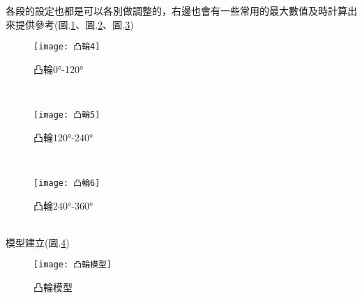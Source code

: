 \begin{itemize}
		\qquad 各段的設定也都是可以各別做調整的，右邊也會有一些常用的最大數值及時計算出來提供參考(圖.\ref{2.14}、圖.\ref{2.15}、圖.\ref{2.16})
		\begin{figure}[hbt!]
		\begin{center}
		\texttt{[image: 凸輪4]}
		\caption{\Large 凸輪0°-120°}\label{2.14}
		\end{center}
		\end{figure}
		\\
		\begin{figure}[hbt!]
		\begin{center}
		\texttt{[image: 凸輪5]}
		\caption{\Large 凸輪120°-240°}\label{2.15}
		\end{center}
		\end{figure}
		\\
		\begin{figure}[hbt!]
		\begin{center}
		\texttt{[image: 凸輪6]}
		\caption{\Large 凸輪240°-360°}\label{2.16}
		\end{center}
		\end{figure}
		\\
		模型建立(圖.\ref{2.17})
		\begin{figure}[hbt!]
		\begin{center}
		\texttt{[image: 凸輪模型]}
		\caption{\Large 凸輪模型}\label{2.17}
		\end{center}
		\end{figure}
		\\
		
\newpage
	

\end{itemize}
